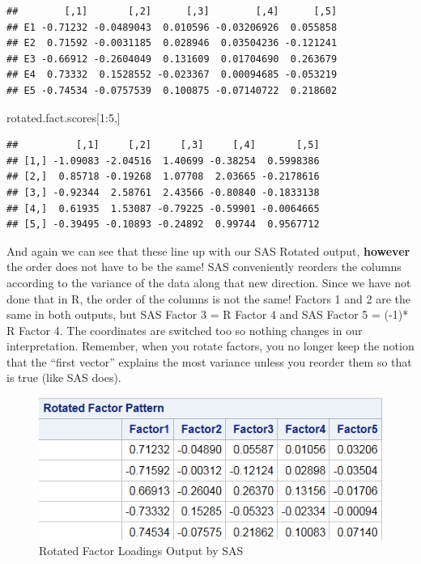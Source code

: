 \documentclass[
]{article}
\newenvironment{Shaded}{\begin{snugshade}}{\end{snugshade}}
\newcommand{\DecValTok}[1]{\textcolor[rgb]{0.00,0.00,0.81}{#1}}
\newcommand{\NormalTok}[1]{#1}
\newcommand{\SpecialCharTok}[1]{\textcolor[rgb]{0.00,0.00,0.00}{#1}}
\theoremstyle{definition}
\theoremstyle{definition}
\theoremstyle{definition}
\theoremstyle{definition}
\theoremstyle{remark}
\begin{document}
\begin{verbatim}
##        [,1]       [,2]      [,3]        [,4]      [,5]
## E1 -0.71232 -0.0489043  0.010596 -0.03206926  0.055858
## E2  0.71592 -0.0031185  0.028946  0.03504236 -0.121241
## E3 -0.66912 -0.2604049  0.131609  0.01704690  0.263679
## E4  0.73332  0.1528552 -0.023367  0.00094685 -0.053219
## E5 -0.74534 -0.0757539  0.100875 -0.07140722  0.218602
\end{verbatim}

\begin{Shaded}
\begin{Highlighting}[]
\NormalTok{rotated.fact.scores[}\DecValTok{1}\SpecialCharTok{:}\DecValTok{5}\NormalTok{,]}
\end{Highlighting}
\end{Shaded}

\begin{verbatim}
##          [,1]     [,2]     [,3]     [,4]       [,5]
## [1,] -1.09083 -2.04516  1.40699 -0.38254  0.5998386
## [2,]  0.85718 -0.19268  1.07708  2.03665 -0.2178616
## [3,] -0.92344  2.58761  2.43566 -0.80840 -0.1833138
## [4,]  0.61935  1.53087 -0.79225 -0.59901 -0.0064665
## [5,] -0.39495 -0.10893 -0.24892  0.99744  0.9567712
\end{verbatim}

And again we can see that these line up with our SAS Rotated output, \textbf{however} the order does not have to be the same! SAS conveniently reorders the columns according to the variance of the data along that new direction. Since we have not done that in R, the order of the columns is not the same! Factors 1 and 2 are the same in both outputs, but SAS Factor 3 = R Factor 4 and SAS Factor 5 = (-1)* R Factor 4. The coordinates are switched too so nothing changes in our interpretation. Remember, when you rotate factors, you no longer keep the notion that the ``first vector'' explains the most variance unless you reorder them so that is true (like SAS does).

\begin{figure}

{\centering \includegraphics[width=1\linewidth]{RotatedLoadings} 

}

\caption{Rotated Factor Loadings Output by SAS}\label{fig:rotloads}
\end{figure}
\end{document}

